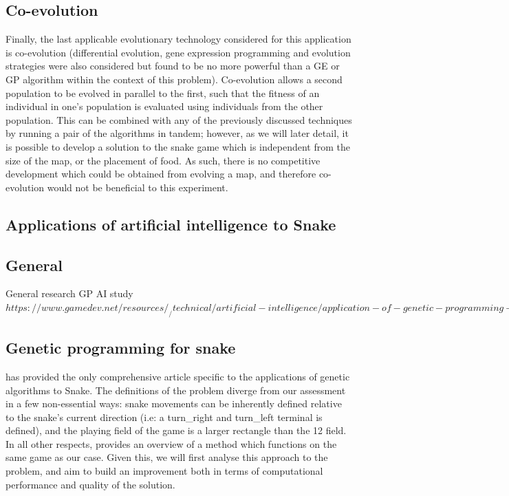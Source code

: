 \documentclass[british,10pt,a4paper]{article}
\begin{document}
\subsection{Co-evolution}
Finally, the last applicable evolutionary technology considered for this application is co-evolution (differential evolution, gene expression programming and evolution strategies were also considered but found to be no more powerful than a GE or GP algorithm within the context of this problem). Co-evolution allows a second population to be evolved in parallel to the first, such that the fitness of an individual in one's population is evaluated using individuals from the other population. This can be combined with any of the previously discussed techniques by running a pair of the algorithms in tandem; however, as we will later detail, it is possible to develop a solution to the snake game which is independent from the size of the map, or the placement of food. As such, there is no competitive development which could be obtained from evolving a map, and therefore co-evolution would not be beneficial to this experiment.


\subsection{Applications of artificial intelligence to Snake}

\subsection{General}
General research 
GP AI study 
\(https://www.gamedev.net/resources/_/technical/artificial-intelligence/application-of-genetic-programming-to-the-snake-r1175\) 

\subsection{Genetic programming for snake}
\label{subsec:gp_snake}
\citet{Ehlis2000-sz} has provided the only comprehensive article specific to the applications of genetic algorithms to Snake. The definitions of the problem diverge from our assessment in a few non-essential ways: snake movements can be inherently defined relative to the snake's current direction (i.e: a turn\_right and turn\_left terminal is defined), and the playing field of the game is a larger rectangle than the 12 field. In all other respects, \citeauthor{Ehlis2000-sz} provides
an overview of a method which functions on the same game as our case. Given this, we will first analyse this approach to the problem, and aim to build an improvement both in terms of computational performance and quality of the solution. \newline
\end{document}
